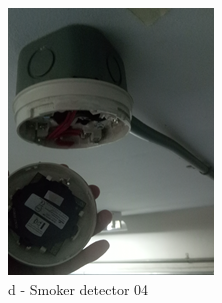 \begin{figure}[!h]
\begin{minipage}[b]{0.22\linewidth}
		\includegraphics[width=\textwidth]{figures/ch05_fdas_sd04}
		\caption*{d - Smoker detector 04}
	\end{minipage}
	\hspace{0.03cm}
	\begin{minipage}[b]{0.22\linewidth}
		\centering

\end{minipage}
\end{figure}
